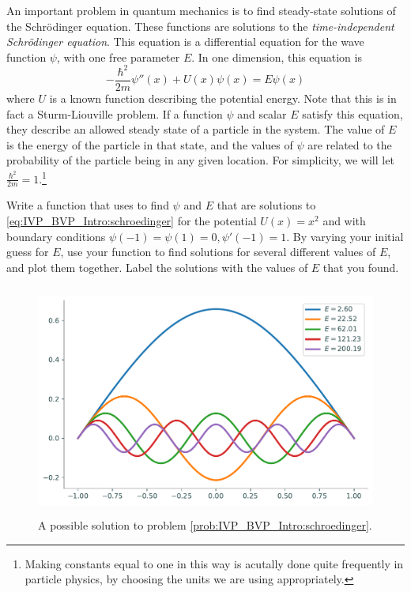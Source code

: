 \begin{problem}
\label{prob:IVP_BVP_Intro:schroedinger}
An important problem in quantum mechanics is to find steady-state solutions of the Schr\"odinger equation.
These functions are solutions to the \textit{time-independent Schr\"odinger equation}.
This equation is a differential equation for the wave function \(\psi\), with one free parameter \(E\).
In one dimension, this equation is
\begin{equation}
\label{eq:IVP_BVP_Intro:schroedinger}
-\frac{\hbar^2}{2m}\psi''(x)+U(x)\psi(x)=E\psi(x)
\end{equation}
where \(U\) is a known function describing the potential energy. 
Note that this is in fact a Sturm-Liouville problem.
If a function \(\psi\) and scalar \(E\) satisfy this equation, they describe an allowed steady state of a particle in the system.
The value of \(E\) is the energy of the particle in that state, and the values of \(\psi\) are related to the probability of the particle being in any given location.
For simplicity, we will let \(\frac{\hbar^2}{2m}=1\).\footnote{Making constants equal to one in this way is acutally done quite frequently in particle physics, by choosing the units we are using appropriately.}

Write a function that uses  to find \(\psi\) and \(E\) that are solutions to \eqref{eq:IVP_BVP_Intro:schroedinger} for the potential \(U(x)=x^2\) and with boundary conditions \(\psi(-1)=\psi(1)=0, \psi'(-1)=1\).
By varying your initial guess for \(E\), use your function to find solutions for several different values of \(E\), and plot them together. Label the solutions with the values of \(E\) that you found. 
\end{problem}

\begin{figure}[H]
    \label{fig:bvpintro:bvp5}
    \centering
    \includegraphics[height=3in]{figures/problem5.pdf}
    \caption{A possible solution to problem \ref{prob:IVP_BVP_Intro:schroedinger}.}
\end{figure}